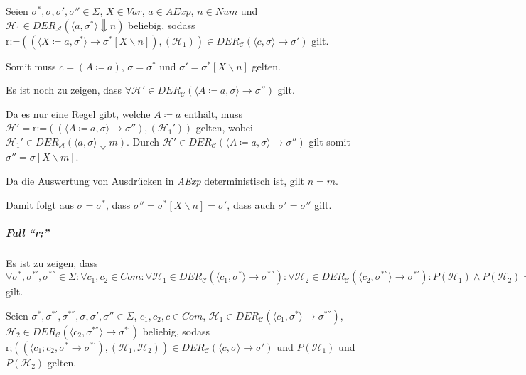 \documentclass[a4paper, 11pt, accentcolor = tud3b]{tudreport}
\begin{document}
					    Seien $ \sigma ^ *, \sigma, \sigma', \sigma'' \in \Sigma $, $ X \in \textit{Var} $, $ a \in \textit{AExp} $, $ n \in \textit{Num} $ und $ \mathcal{H} _ 1 \in \textit{DER} _ \mathcal{A} (\langle a, \sigma ^ * \rangle \Downarrow n) $ beliebig, sodass $ \text{r:=}((\langle X \coloneqq a, \sigma ^ * \rangle \rightarrow \sigma ^ * [X \backslash n]), (\mathcal{H} _ 1)) \in \textit{DER} _ \mathcal{C} (\langle c, \sigma \rangle \rightarrow \sigma') $ gilt.
					    
					    Somit muss $ c = (A \coloneqq a) $, $ \sigma = \sigma ^ * $ und $ \sigma' = \sigma ^ * [X \backslash n] $ gelten.
					    
					    Es ist noch zu zeigen, dass $ \forall \mathcal{H}' \in \textit{DER} _ \mathcal{C} (\langle A \coloneqq a, \sigma \rangle \rightarrow \sigma'') $ gilt.
					    
					    Da es nur eine Regel gibt, welche $ A \coloneqq a $ enthält, muss $ \mathcal{H}' = \text{r:=}((\langle A \coloneqq a, \sigma \rangle \rightarrow \sigma''), (\mathcal{H} _ 1 ')) $ gelten, wobei $ \mathcal{H} _ 1 ' \in \textit{DER} _ \mathcal{A} (\langle a, \sigma \rangle \Downarrow m) $. Durch $ \mathcal{H}' \in \textit{DER} _ \mathcal{C} (\langle A \coloneqq a, \sigma \rangle \rightarrow \sigma'') $ gilt somit $ \sigma'' = \sigma[X \backslash m] $.
					    
					    Da die Auswertung von Ausdrücken in \textit{AExp} deterministisch ist, gilt $ n = m $.
					    
					    Damit folgt aus $ \sigma = \sigma ^ * $, dass $ \sigma'' = \sigma ^ * [X \backslash n] = \sigma' $, dass auch $ \sigma' = \sigma'' $ gilt.
				    
				    \subparagraph{Fall \enquote{r;}}
					    Es ist zu zeigen, dass $ \forall \sigma ^ *, \sigma ^ {*'}, \sigma ^ {*''} \in \Sigma : \forall c _ 1, c _ 2 \in \textit{Com} : \forall \mathcal{H} _ 1 \in \textit{DER} _ \mathcal{C} (\langle c _ 1, \sigma ^ * \rangle \rightarrow \sigma ^ {*''}) : \forall \mathcal{H} _ 2 \in \textit{DER} _ \mathcal{C} (\langle c _ 2, \sigma ^ {*''} \rangle \rightarrow \sigma ^ {*'}) : P(\mathcal{H} _ 1) \land P(\mathcal{H} _ 2) \implies P(\text{r;}((\langle c _ 1 ; c _ 2, \sigma ^ * \rangle \rightarrow \sigma ^ {*'}), (\mathcal{H} _ 1, \mathcal{H} _ 2))) $ gilt.
					    
					    Seien $ \sigma ^ *, \sigma ^ {*'}, \sigma ^ {*''}, \sigma, \sigma', \sigma'' \in \Sigma $, $ c _ 1, c _ 2, c \in \textit{Com} $, $ \mathcal{H} _ 1 \in \textit{DER} _ \mathcal{C} (\langle c _ 1, \sigma ^ * \rangle \rightarrow \sigma ^ {*''}) $, $ \mathcal{H} _ 2 \in \textit{DER} _ \mathcal{C} (\langle c _ 2, \sigma ^ {*''} \rangle \rightarrow \sigma ^ {*'}) $ beliebig, sodass $ \text{r;}((\langle c _ 1 ; c _ 2, \sigma ^ * \rightarrow \sigma ^ {*'}), (\mathcal{H} _ 1, \mathcal{H} _ 2)) \in \textit{DER} _ \mathcal{C} (\langle c, \sigma \rangle \rightarrow \sigma') $ und $ P(\mathcal{H} _ 1) $ und $ P(\mathcal{H} _ 2) $ gelten.
					    
\end{document}
